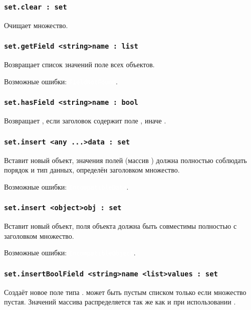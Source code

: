 \documentclass[a4paper, 14pt]{extarticle}
\newcommand{\ferror}[1]{{\fontsize{11pt}{12pt} \tt \colorbox{function}{\textcolor{white}{#1}}}}
\begin{document}
\subsubsection{\lstinline|set.clear : set|}

Очищает множество.

\subsubsection{\lstinline|set.getField <string>name : list|}

Возвращает список значений поле  всех объектов.

Возможные ошибки: \ferror{FieldNotFound}.

\subsubsection{\lstinline|set.hasField <string>name : bool|}

Возвращает \true, если заголовок содержит поле , иначе \false.

\subsubsection{\lstinline|set.insert <any ...>data : set|}

Вставит новый объект, значения полей (массив ) должна полностью соблюдать порядок и тип данных, определён заголовком множество.

Возможные ошибки: \ferror{IncompatibleData}.

\subsubsection{\lstinline|set.insert <object>obj : set|}

Вставит новый объект, поля объекта  должна быть совместимы полностью с заголовком множество.

Возможные ошибки: \ferror{IncompatibleObject}.

\subsubsection{\lstinline|set.insertBoolField <string>name <list>values : set|}

Создаёт новое поле типа \bool.  может быть пустым списком только если множество пустая. Значений массива распределяется так же как и при использовании .
\end{document}
